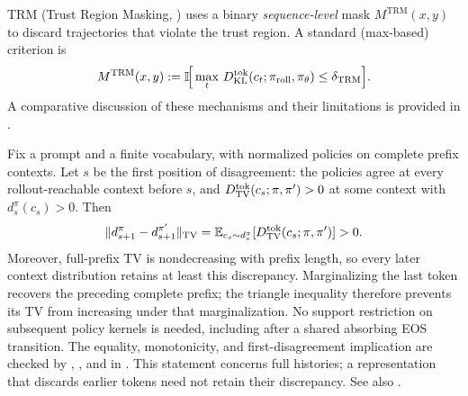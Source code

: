 TRM (Trust Region Masking, \citet{li2025trm}) uses a binary \emph{sequence-level} mask $M^{\mathrm{TRM}}(x,y)$ to discard trajectories that violate the
trust region. A standard (max-based) criterion is
\begin{equation*}
    M^{\mathrm{TRM}}(x,y)
    := \mathbb{I}\!\Big[\max_{t}\,D_{\mathrm{KL}}^{\mathrm{tok}}(c_t;\pi_{\mathrm{roll}},\pi_{\theta}) \le \delta_{\mathrm{TRM}}\Big].
\end{equation*}
A comparative discussion of these mechanisms and their limitations is provided in .

\begin{remark}
\label{rem:coupling}
Fix a prompt and a finite vocabulary, with normalized policies on complete
prefix contexts. Let $s$ be the first position of disagreement: the policies
agree at every rollout-reachable context before $s$, and
$D_{\mathrm{TV}}^{\mathrm{tok}}(c_s;\pi,\pi')>0$ at some context with $d_s^\pi(c_s)>0$. Then
\begin{equation*}
    \|d_{s+1}^{\pi}-d_{s+1}^{\pi'}\|_{\mathrm{TV}}
    = \mathbb{E}_{c_s\sim d_s^\pi}[D_{\mathrm{TV}}^{\mathrm{tok}}(c_s;\pi,\pi')] > 0.
\end{equation*}
Moreover, full-prefix TV is nondecreasing with prefix length, so every later
context distribution retains at least this discrepancy. Marginalizing the
last token recovers the preceding complete prefix; the triangle inequality
therefore prevents its TV from increasing under that marginalization.
No support restriction on subsequent policy kernels is needed, including
after a shared absorbing EOS transition. The equality, monotonicity, and
first-disagreement implication are checked by
, , and
 in .
This statement concerns full histories; a representation that discards
earlier tokens need not retain their discrepancy. See also \citet{li2025trm}.
\end{remark}
